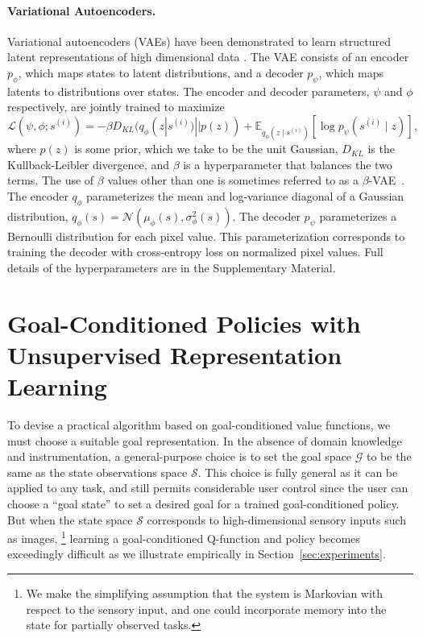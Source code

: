\documentclass{article}
\begin{document}
\paragraph{Variational Autoencoders.}
Variational autoencoders (VAEs) have been demonstrated to learn structured latent representations of high dimensional data \cite{kingma2014vae}.
The VAE consists of an encoder $p_\phi$, which maps states to latent distributions,
and a decoder $p_\psi$, which maps latents to distributions over states.
The encoder and decoder parameters, $\psi$ and $\phi$ respectively, are jointly trained to maximize
\begin{equation}\label{eq:vae-loss}
    \mathcal L (\psi, \phi; s^{(i)}) = - \beta D_{KL}(q_\phi(z | s^{(i)}) || p(z)) + \mathbb E_{q_\phi(z \mid s^{(i)})} [ \log p_\psi(s^{(i)} \mid z) ],
\end{equation}
where $p(z)$ is some prior, which we take to be the unit Gaussian, $D_{KL}$ is the Kullback-Leibler divergence, and $\beta$ is a hyperparameter that balances the two terms.
The use of $\beta$ values other than one is sometimes referred to as a $\beta$-VAE~\cite{higgins2016beta}.
The encoder $q_\phi$ parameterizes the mean and log-variance diagonal of a Gaussian distribution, $q_\phi(s) = \mathcal N(\mu_\phi(s), \sigma^2_\phi(s))$.
The decoder $p_\psi$ parameterizes a Bernoulli distribution for each pixel value.
This parameterization corresponds to training the decoder with cross-entropy loss on normalized pixel values.
Full details of the hyperparameters are in the Supplementary Material.

\section{Goal-Conditioned Policies with Unsupervised Representation Learning}
To devise a practical algorithm based on goal-conditioned value functions, we must choose a suitable goal representation.
In the absence of domain knowledge and instrumentation, a general-purpose choice is to set the goal space $\mathcal G$ to be the same as the state observations space $\mathcal S$.
This choice is fully general as it can be applied to any task, and still permits considerable user control since the user can choose a ``goal state'' to set a desired goal for a trained goal-conditioned policy.
But when the state space $\mathcal S$ corresponds to high-dimensional sensory inputs
such as images,
\setcounter{footnote}{0}
\footnote{We make the simplifying assumption that the system is Markovian with respect to the sensory input, and one could incorporate memory into the state for partially observed tasks.}
learning a goal-conditioned Q-function and policy becomes exceedingly difficult as we illustrate empirically in Section~\ref{sec:experiments}.
\end{document}
